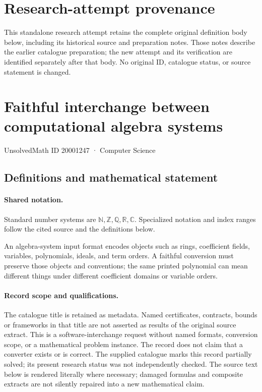 \documentclass[11pt]{article}
\begin{document}
\section*{Research-attempt provenance}
This standalone research attempt retains the complete original definition body below,
including its historical source and preparation notes. Those notes describe the
earlier catalogue preparation; the new attempt and its verification are identified
separately after that body. No original ID, catalogue status, or source statement is changed.

\section{Faithful interchange between computational algebra systems}\label{20001247}
{\small UnsolvedMath ID 20001247 · Computer Science}
\subsection{Definitions and mathematical statement}

\paragraph{Shared notation.}Standard number systems are $\mathbb N,\mathbb Z,\mathbb Q,\mathbb R,\mathbb C$. Specialized notation and index ranges follow the cited source and the definitions below.


An algebra-system input format encodes objects such as rings, coefficient fields, variables, polynomials, ideals, and term orders. A faithful conversion must preserve those objects and conventions; the same printed polynomial can mean different things under different coefficient domains or variable orders.
\paragraph{Record scope and qualifications.}
The catalogue title is retained as metadata. Named certificates, contracts, bounds or frameworks in that title are not asserted as results of the original source extract.
This is a software-interchange request without named formats, conversion scope, or a mathematical problem instance. The record does not claim that a converter exists or is correct. The supplied catalogue marks this record partially solved; its present research status was not independently checked.
The source text below is rendered literally where necessary; damaged formulas and composite extracts are not silently repaired into a new mathematical claim.
\end{document}
